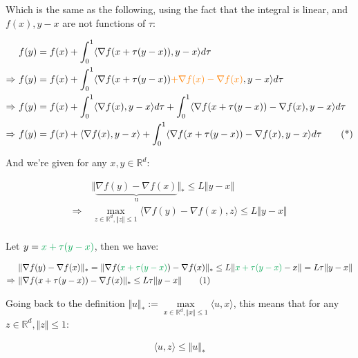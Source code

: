 \documentclass{article}
\begin{document}
Which is the same as the following, using the fact that the integral is linear, and $f ( x ), y - x$ are not functions of $\tau$:

\begin{align*}
    &f(y) = f(x) + \int^{1}_{0} \langle \nabla f ( x + \tau ( y - x ) ) , y - x \rangle d\tau \\
    \Rightarrow \ &f(y) = f(x) + \int_0^1 \langle \nabla f ( x + \tau ( y - x ) ) \textcolor{orange}{+ \nabla f ( x ) - \nabla f ( x )}, y - x \rangle d\tau \\
    \Rightarrow \ &f(y) = f(x) + \int_0^1 \langle \nabla f ( x ), y - x \rangle d\tau + \int_0^1 \langle \nabla f ( x + \tau ( y - x ) ) - \nabla f ( x ), y - x \rangle d\tau \\
    \Rightarrow \ &f(y) = f(x) + \langle \nabla f ( x ), y - x \rangle + \int_0^1 \langle \nabla f ( x + \tau ( y - x ) ) - \nabla f ( x ), y - x \rangle d\tau \tag{*}
\end{align*}

And we're given for any $x, y \in \mathbb{R}^d$:

\begin{align*}
    &\Vert \underbrace{\nabla f ( y ) - \nabla f ( x )}_{\text{u}} \Vert_* \leq L \Vert y - x \Vert \\
    \Rightarrow \ &\max_{z \in \mathbb{R}^d, \Vert z \Vert \leq 1} \langle \nabla f ( y ) - \nabla f ( x ), z \rangle \leq L \Vert y - x \Vert \\
\end{align*}

Let $y = \textcolor{Green}{x + \tau ( y - x )}$, then we have:

\begin{align*}
    &\Vert \nabla f ( y ) - \nabla f ( x ) \Vert_* = \Vert \nabla f ( \textcolor{Green}{x + \tau ( y - x )} ) - \nabla f ( x ) \Vert_* \leq L \Vert \textcolor{Green}{x + \tau ( y - x )} - x \Vert = L \tau \Vert y - x \Vert \\
    \Rightarrow \ &\Vert \nabla f ( x + \tau ( y - x ) ) - \nabla f ( x ) \Vert_* \leq L \tau \Vert y - x \Vert \tag{1}
\end{align*}

Going back to the definition $\Vert u \Vert_* := \underset{x \in \mathbb{R}^d, \Vert x \Vert \leq 1}{\max} \langle u, x \rangle$, 
this means that for any $z \in \mathbb{R}^d, \Vert z \Vert \leq 1$:

\begin{align*}
    \langle u, z \rangle \leq \Vert u \Vert_*
\end{align*}
\end{document}
